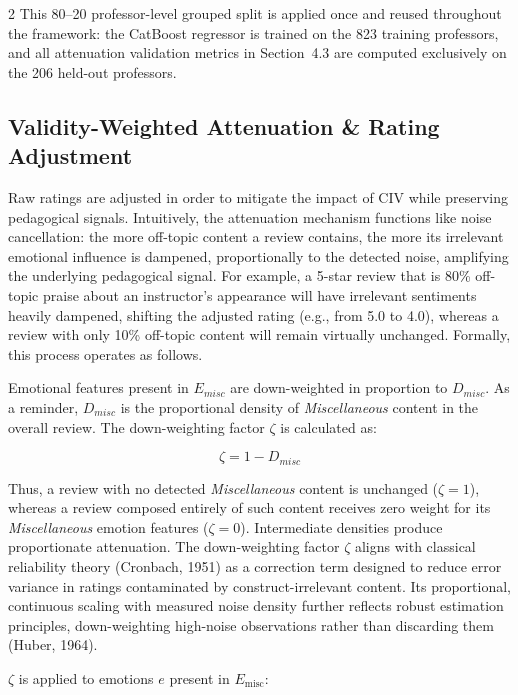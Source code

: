 \documentclass{article}
\begin{document}
\begin{multicols*}{2}
This 80--20 professor-level grouped split is applied once and reused throughout the framework: the CatBoost regressor is trained on the 823 training professors, and all attenuation validation metrics in Section~4.3 are computed exclusively on the 206 held-out professors.

\subsection{Validity-Weighted Attenuation \& Rating Adjustment}
Raw ratings are adjusted in order to mitigate the impact of CIV while preserving pedagogical signals. Intuitively, the attenuation mechanism functions like noise cancellation: the more off-topic content a review contains, the more its irrelevant emotional influence is dampened, proportionally to the detected noise, amplifying the underlying pedagogical signal. For example, a 5-star review that is 80\% off-topic praise about an instructor's appearance will have irrelevant sentiments heavily dampened, shifting the adjusted rating (e.g., from 5.0 to 4.0), whereas a review with only 10\% off-topic content will remain virtually unchanged. Formally, this process operates as follows.

Emotional features present in $E_{misc}$ are down-weighted in proportion to $D_{misc}$. As a reminder, $D_{misc}$ is the proportional density of \textit{Miscellaneous} content in the overall review. The down-weighting factor $\zeta$ is calculated as: 

\begin{equation}
    \zeta = 1-D_{misc}
\end{equation}\newline

Thus, a review with no detected \textit{Miscellaneous} content is unchanged ($\zeta=1$), whereas a review composed entirely of such content receives zero weight for its \textit{Miscellaneous} emotion features ($\zeta=0$). Intermediate densities produce proportionate attenuation. The down-weighting factor $\zeta$ aligns with classical reliability theory (Cronbach, 1951) as a correction term designed to reduce error variance in ratings contaminated by construct-irrelevant content. Its proportional, continuous scaling with measured noise density further reflects robust estimation principles, down-weighting high-noise observations rather than discarding them (Huber, 1964).

$\zeta$ is applied to emotions $e$ present in $E_{\text{misc}}$:


\end{multicols*}
\end{document}
